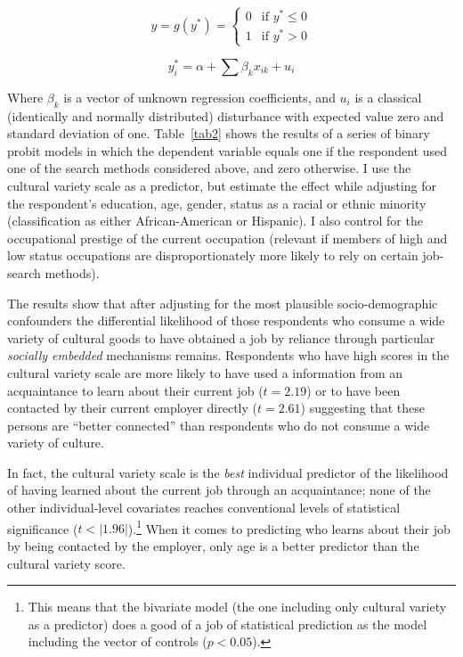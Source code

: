 \documentclass[12pt]{article}
\begin{document}
\begin{equation}
y=g(y^{*})=\left\{
        \begin{array}{rl}
                0 &\mbox{if $y^{*} \leq 0$} \\
                1 &\mbox{if $y^{*} > 0$}
        \end{array}\right.		
        \label{eq1}
\end{equation}


\begin{equation}
	y^{*}_{i}=\alpha+\sum{\beta_{k} x_{ik}}+u_{i}
\end{equation}

Where $\beta_{k}$ is a vector of unknown regression coefficients, and $u_{i}$ is a classical (identically and normally distributed) disturbance with expected value zero and standard deviation of one.  Table~\ref{tab2} shows the results of a series of binary probit models in which the dependent variable equals one if the respondent used one of the search methods considered above, and zero otherwise.  I use the cultural variety scale as a predictor, but estimate the effect while adjusting for the respondent's education, age, gender, status as a racial or ethnic minority (classification as either African-American or Hispanic).  I also control for the occupational prestige of the current occupation (relevant if members of high and low status occupations are disproportionately more likely to rely on certain job-search methods\citep{mouw03}).

The results show that after adjusting for the most plausible socio-demographic confounders the differential likelihood of those respondents who consume a wide variety of cultural goods to have obtained a job by reliance through particular \emph{socially embedded} mechanisms remains.  Respondents who have high scores in the cultural variety scale are more likely to have used a information from an acquaintance to learn about their current job ($t=2.19$) or to have been contacted by their current employer directly ($t=2.61$) suggesting that these persons are ``better connected'' than respondents who do not consume a wide variety of culture.  

In fact, the cultural variety scale is the \emph{best} individual predictor of the likelihood of having learned about the current job through an acquaintance; none of the other individual-level covariates reaches conventional levels of statistical significance ($t<|1.96|$).\footnote{This means that the bivariate model (the one including only cultural variety as a predictor) does a good of a job of statistical prediction as the model including the vector of controls ($p<0.05$).}  When it comes to predicting who learns about their job by being contacted by the employer, only age is a better predictor than the cultural variety score.   
\end{document}
